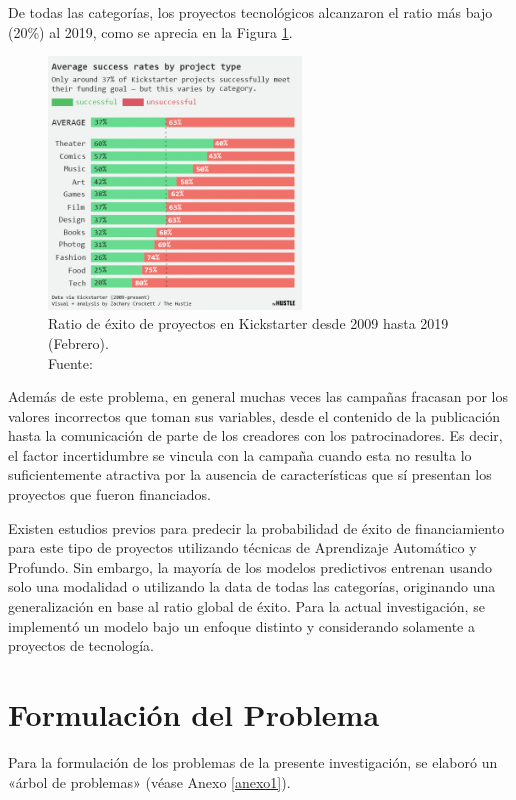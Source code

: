De todas las categorías, los proyectos tecnológicos alcanzaron el ratio más bajo (20\%) al 2019, como se aprecia en la Figura \ref{1:fig2}.
\begin{figure}[h]
	\begin{center}
		\includegraphics[width=0.6\textwidth]{1/figures/kickstarter_success_rate_2009_2019.jpg}
		\caption[Ratio de éxito de proyectos en Kickstarter desde 2009 hasta 2019 (Febrero)]{Ratio de éxito de proyectos en Kickstarter desde 2009 hasta 2019 (Febrero).\\
		Fuente: \cite{cr_hustle2019successrate}}
		\label{1:fig2}
	\end{center}
\end{figure}

Además de este problema, en general muchas veces las campañas fracasan por los valores incorrectos que toman sus variables, desde el contenido de la publicación hasta la comunicación de parte de los creadores con los patrocinadores. Es decir, el factor incertidumbre se vincula con la campaña cuando esta no resulta lo suficientemente atractiva por la ausencia de características que sí presentan los proyectos que fueron financiados.

Existen estudios previos para predecir la probabilidad de éxito de financiamiento para este tipo de proyectos utilizando técnicas de Aprendizaje Automático y Profundo. Sin embargo, la mayoría de los modelos predictivos entrenan usando solo una modalidad o utilizando la data de todas las categorías, originando una generalización en base al ratio global de éxito. Para la actual investigación, se implementó un modelo bajo un enfoque distinto y considerando solamente a proyectos de tecnología.

\section{Formulación del Problema}
Para la formulación de los problemas de la presente investigación, se elaboró un «árbol de problemas» (véase Anexo \ref{anexo1}).

